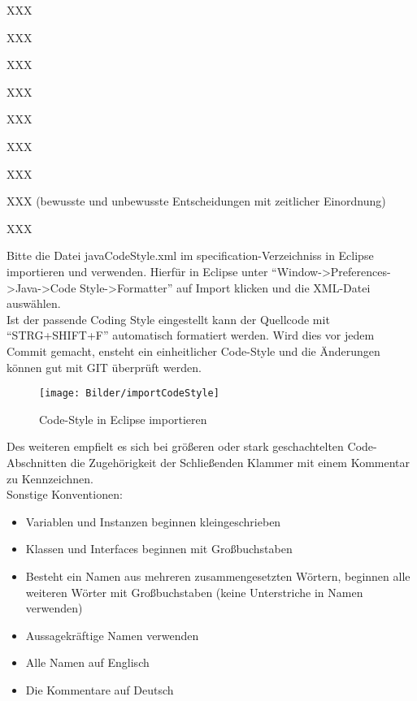 \documentclass[twoside]{report}
\begin{document}
XXX
\nsecend

XXX
\nsecend

XXX
\nsecend

XXX
\nsecend


\nsecend

\nsecend %



\nsecend

XXX
\nsecend

XXX
\nsecend

XXX
\nsecend

XXX (bewusste und unbewusste Entscheidungen mit zeitlicher Einordnung)
\nsecend


\nsecend %


XXX
\nsecend

Bitte die Datei javaCodeStyle.xml im specification-Verzeichniss in Eclipse importieren und verwenden.
Hierfür in Eclipse unter "`Window->Preferences->Java->Code Style->Formatter"' auf Import klicken und die XML-Datei auswählen.\\
Ist der passende Coding Style eingestellt kann der Quellcode mit "`STRG+SHIFT+F"' automatisch formatiert werden.
Wird dies vor jedem Commit gemacht, ensteht ein einheitlicher Code-Style und die Änderungen können gut mit GIT überprüft werden.\\
\begin{figure}[hbtp]
\centering
\texttt{[image: Bilder/importCodeStyle]}
\caption{Code-Style in Eclipse importieren}
\end{figure}
Des weiteren empfielt es sich bei größeren oder stark geschachtelten Code-Abschnitten die Zugehörigkeit der Schließenden Klammer mit einem Kommentar zu Kennzeichnen.\\
Sonstige Konventionen:
\begin{itemize}
\item{Variablen und Instanzen beginnen kleingeschrieben}
\item{Klassen und Interfaces beginnen mit Großbuchstaben}
\item{Besteht ein Namen aus mehreren zusammengesetzten Wörtern, beginnen alle weiteren Wörter mit Großbuchstaben (keine Unterstriche in Namen verwenden)}
\item{Aussagekräftige Namen verwenden}
\item{Alle Namen auf Englisch}
\item{Die Kommentare auf Deutsch}
\end{itemize}
\end{document}
